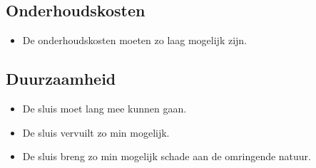 \documentclass[../verslag.tex]{subfiles}
\begin{document}
\subsection{Onderhoudskosten}
\begin{itemize}
    \item De onderhoudskosten moeten zo laag mogelijk zijn.
\end{itemize}

\subsection{Duurzaamheid}
\begin{itemize}
    \item De sluis moet lang mee kunnen gaan.
    \item De sluis vervuilt zo min mogelijk.
    \item De sluis breng zo min mogelijk schade aan de omringende natuur.
\end{itemize}
\end{document}
